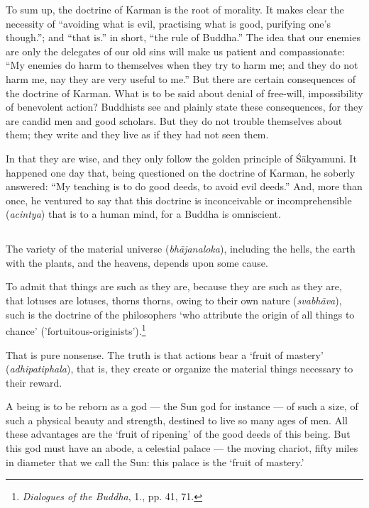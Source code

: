\documentclass[a4paper, 11pt, oneside, english, landscape]{article}
\begin{document}
To sum up, the doctrine of Karman is the root of morality. It makes clear the necessity of ``avoiding what is evil, practising what is good, purifying one's though.''; and ``that is.'' in short, ``the rule of Buddha.'' The idea that our enemies are only the delegates of our old sins will make us patient and compassionate: ``My enemies do harm to themselves when they try to harm me; and they do not harm me, nay they are very useful to me.'' But there are certain consequences of the doctrine of Karman. What is to be said about denial of free-will, impossibility of benevolent action? Buddhists see and plainly state these consequences, for they are candid men and good scholars. But they do not trouble themselves about them; they write and they live as if they had not seen them.

In that they are wise, and they only follow the golden principle of Śākyamuni. It happened one day that, being questioned on the doctrine of Karman, he soberly answered: ``My teaching is to do good deeds, to avoid evil deeds.'' And, more than once, he ventured to say that this doctrine is inconceivable or incomprehensible (\emph{acintya}) that is to a human mind, for a Buddha is omniscient.

\subsection{}
\paragraph{}
The variety of the material universe (\emph{bhājanaloka}), including the hells, the earth with the plants, and the heavens, depends upon some cause.

To admit that things are such as they are, because they are such as they are, that lotuses are lotuses, thorns thorns, owing to their own nature (\emph{svabhāva}), such is the doctrine of the philosophers `who attribute the origin of all things to chance' ('fortuitous-originists').\footnote{\emph{Dialogues of the Buddha}, 1., pp. 41, 71.}

That is pure nonsense. The truth is that actions bear a `fruit of mastery' (\emph{adhipatiphala}), that is, they create or organize the material things necessary to their reward.

A being is to be reborn as a god --- the Sun god for instance --- of such a size, of such a physical beauty and strength, destined to live so many ages of men. All these advantages are the `fruit of ripening' of the good deeds of this being. But this god must have an abode, a celestial palace --- the moving chariot, fifty miles in diameter that we call the Sun: this palace is the `fruit of mastery.'
\end{document}
